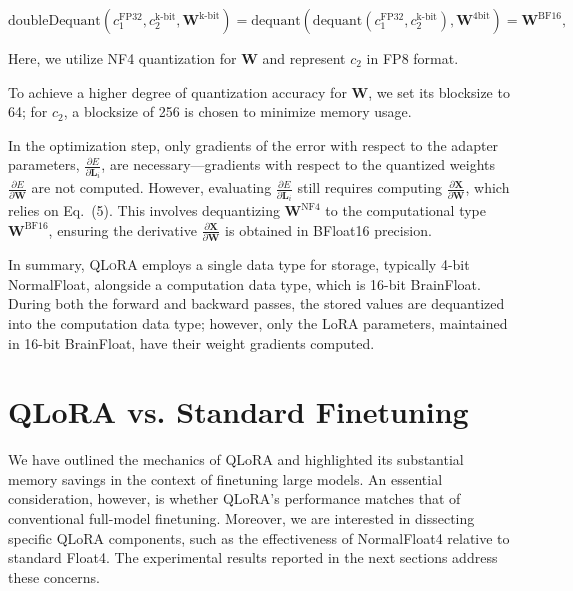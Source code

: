 \begin{equation}
    \text{doubleDequant}(c_1^{\text{FP32}}, c_2^{\text{k-bit}}, \mathbf{W}^{\text{k-bit}}) = \text{dequant}(\text{dequant}(c_1^{\text{FP32}}, c_2^{\text{k-bit}}), \mathbf{W}^{\text{4bit}}) = \mathbf{W}^{\text{BF16}},
\end{equation}

Here, we utilize NF4 quantization for $\mathbf{W}$ and represent $c_2$ in FP8 format.

To achieve a higher degree of quantization accuracy for $\mathbf{W}$, we set its blocksize to 64; for $c_2$, a blocksize of 256 is chosen to minimize memory usage.

In the optimization step, only gradients of the error with respect to the adapter parameters, $\frac{\partial E}{\partial \mathbf{L}_i}$, are necessary—gradients with respect to the quantized weights $\frac{\partial E}{\partial \mathbf{W}}$ are not computed. However, evaluating $\frac{\partial E}{\partial \mathbf{L}_i}$ still requires computing $\frac{\partial \mathbf{X}}{\partial \mathbf{W}}$, which relies on Eq.~(5). This involves dequantizing $\mathbf{W}^{\text{NF4}}$ to the computational type $\mathbf{W}^{\text{BF16}}$, ensuring the derivative $\frac{\partial \mathbf{X}}{\partial \mathbf{W}}$ is obtained in BFloat16 precision.

In summary, \textsc{QLoRA} employs a single data type for storage, typically 4-bit NormalFloat, alongside a computation data type, which is 16-bit BrainFloat. During both the forward and backward passes, the stored values are dequantized into the computation data type; however, only the LoRA parameters, maintained in 16-bit BrainFloat, have their weight gradients computed.

\section{QLoRA vs. Standard Finetuning}
\label{sec:comp_to_std}

We have outlined the mechanics of QLoRA and highlighted its substantial memory savings in the context of finetuning large models. An essential consideration, however, is whether QLoRA’s performance matches that of conventional full-model finetuning. Moreover, we are interested in dissecting specific QLoRA components, such as the effectiveness of NormalFloat4 relative to standard Float4. The experimental results reported in the next sections address these concerns.

